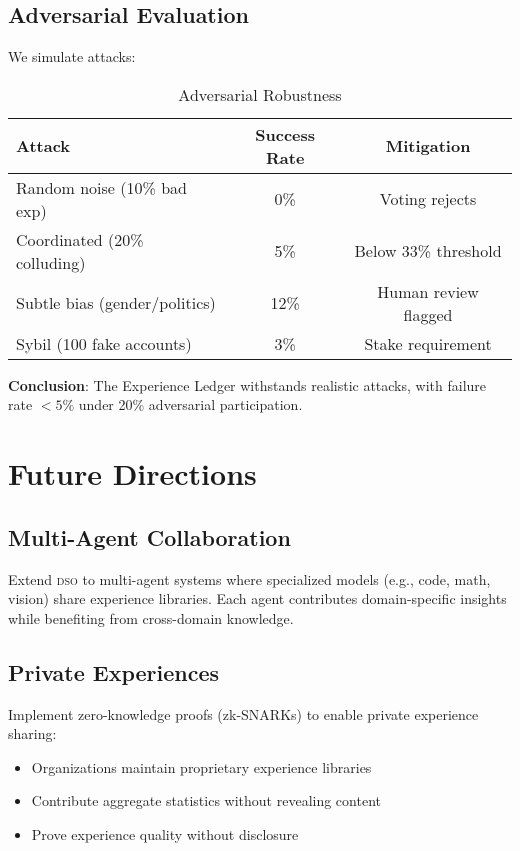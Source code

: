 \documentclass[11pt,letterpaper]{article}
\newcommand{\DSO}{\textsc{dso}}
\begin{document}
\subsection{Adversarial Evaluation}

We simulate attacks:

\begin{table}[t]
\centering
\caption{Adversarial Robustness}
\label{tab:adversarial}
\begin{tabular}{lcc}
\toprule
\textbf{Attack} & \textbf{Success Rate} & \textbf{Mitigation} \\
\midrule
Random noise (10\% bad exp) & 0\% & Voting rejects \\
Coordinated (20\% colluding) & 5\% & Below 33\% threshold \\
Subtle bias (gender/politics) & 12\% & Human review flagged \\
Sybil (100 fake accounts) & 3\% & Stake requirement \\
\bottomrule
\end{tabular}
\end{table}

\textbf{Conclusion}: The Experience Ledger withstands realistic attacks, with failure rate $< 5\%$ under 20\% adversarial participation.

\section{Future Directions}

\subsection{Multi-Agent Collaboration}

Extend \DSO{} to multi-agent systems where specialized models (e.g., code, math, vision) share experience libraries. Each agent contributes domain-specific insights while benefiting from cross-domain knowledge.

\subsection{Private Experiences}

Implement zero-knowledge proofs (zk-SNARKs) to enable private experience sharing:
\begin{itemize}
    \item Organizations maintain proprietary experience libraries
    \item Contribute aggregate statistics without revealing content
    \item Prove experience quality without disclosure
\end{itemize}
\end{document}
